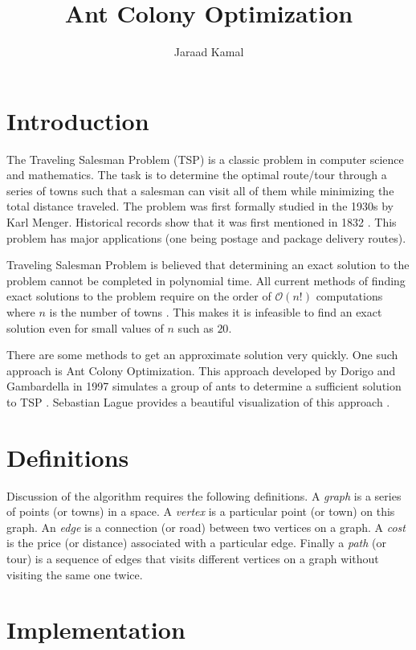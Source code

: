 \documentclass[twocolumn]{article}
\begin{document}
\title{Ant Colony Optimization}
\author{Jaraad Kamal}
\date{}
\maketitle
\section{Introduction} \label{Intro}
The Traveling Salesman Problem (TSP) is a classic problem in 
computer science and mathematics. The task is to determine the optimal route/tour through a 
series of towns such that a salesman can visit all of them while minimizing the total distance 
traveled. The problem was first formally studied in the 1930s by Karl Menger. Historical records 
show that it was first mentioned in 1832 \cite{yu_2014}. 
This problem has major applications (one being 
postage and package delivery routes).

Traveling Salesman Problem is believed that determining an exact solution to the problem
cannot be completed in polynomial time.  All current methods of finding exact solutions 
to the problem require on the order of $\mathcal{O}(n!)$ computations where $n$ is
the number of towns \cite{yu_2014}. This makes it is infeasible to find an exact solution 
even for small values of $n$ such as $20$.

There are some methods to get an approximate solution very quickly. 
One such approach is Ant Colony Optimization. This approach 
developed by Dorigo and Gambardella in 1997 simulates a group of ants to 
determine a sufficient solution to TSP \cite{585892}. Sebastian Lague provides a 
beautiful visualization of this approach \cite{lague_2021}.

\section{Definitions}
Discussion of the algorithm requires the following definitions. A \textit{graph} is a series
of points (or towns) in a space. A \textit{vertex} is a particular point (or town) on this graph.
An \textit{edge} is a connection (or road) between two vertices on a graph. A \textit{cost} is 
the price (or distance) associated with a particular edge. Finally a \textit{path} (or tour) is a 
sequence of edges that visits different vertices on a graph without visiting the same one twice.


\section{Implementation} \label{Algos}
\end{document}
